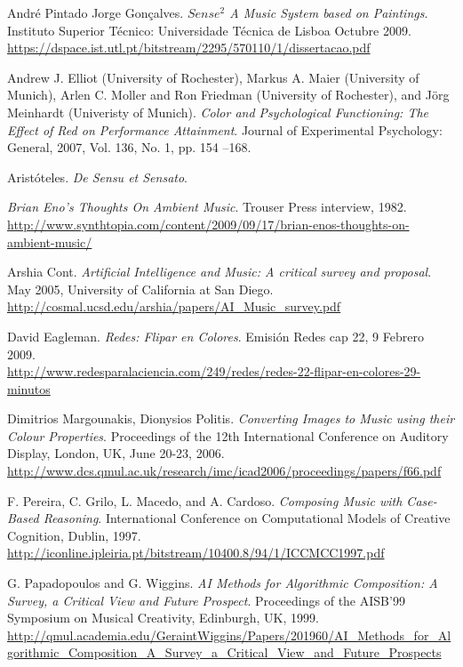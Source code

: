 \begin{thebibliography}{9}
  André Pintado Jorge Gonçalves. \emph{$Sense^{2}$ A Music System based on Paintings}. Instituto Superior Técnico: Universidade Técnica de Lisboa Octubre 2009.\\
 \url{https://dspace.ist.utl.pt/bitstream/2295/570110/1/dissertacao.pdf}

  Andrew J. Elliot (University of Rochester), Markus A. Maier (University of Munich), Arlen C. Moller and Ron Friedman (University of Rochester), and Jörg Meinhardt (Univeristy of Munich). \emph{Color and Psychological Functioning: The Effect of Red on Performance Attainment}. Journal of Experimental Psychology: General, 2007, Vol. 136, No. 1, pp. 154 –168.

 Aristóteles. \emph{De Sensu et Sensato}.

 \emph{Brian Eno's Thoughts On Ambient Music}. Trouser Press interview, 1982. \\
 \url{http://www.synthtopia.com/content/2009/09/17/brian-enos-thoughts-on-ambient-music/}

 Arshia Cont. \emph{Artificial Intelligence and Music: A critical survey and proposal}. May 2005, University of California at San Diego.\\
 \url{http://cosmal.ucsd.edu/arshia/papers/AI_Music_survey.pdf}

 David Eagleman. \emph{Redes: Flipar en Colores}. Emisión Redes cap 22, 9 Febrero 2009.\\
 \url{http://www.redesparalaciencia.com/249/redes/redes-22-flipar-en-colores-29-minutos}

 Dimitrios Margounakis, Dionysios Politis. \emph{Converting Images to Music using their Colour Properties}. Proceedings of the 12th International Conference on Auditory Display, London, UK, June 20-23, 2006.\\
 \url{http://www.dcs.qmul.ac.uk/research/imc/icad2006/proceedings/papers/f66.pdf}

 F. Pereira, C. Grilo, L. Macedo, and A. Cardoso. \emph{Composing Music with Case-Based Reasoning}. International Conference on Computational Models of Creative Cognition, Dublin, 1997.
 \url{http://iconline.ipleiria.pt/bitstream/10400.8/94/1/ICCMCC1997.pdf}

 G. Papadopoulos and G. Wiggins. \emph{AI Methods for Algorithmic Composition: A Survey, a Critical View  and Future Prospect}. Proceedings of the AISB’99 Symposium on Musical Creativity, Edinburgh, UK, 1999.\\
 \url{http://qmul.academia.edu/GeraintWiggins/Papers/201960/AI_Methods_for_Algorithmic_Composition_A_Survey_a_Critical_View_and_Future_Prospects}


\end{thebibliography}
